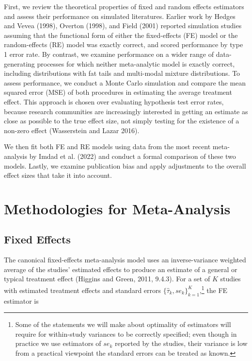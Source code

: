 \documentclass[12pt]{article}
\begin{document}
First, we review the theoretical properties of fixed and random effects estimators and assess their performance on simulated literatures. Earlier work by Hedges and Vevea (1998), Overton (1998), and Field (2001) reported simulation studies assuming that the functional form of either the fixed-effects (FE) model or the random-effects (RE) model was exactly correct, and scored performance by type 1 error rate. By contrast, we examine performance on a wider range of data-generating processes for which neither meta-analytic model is exactly correct, including distributions with fat tails and multi-modal mixture distributions. To assess performance, we conduct a Monte Carlo simulation and compare the mean squared error (MSE) of both procedures in estimating the average treatment effect. 
This approach is chosen over evaluating hypothesis test error rates, because research communities are increasingly interested in getting an estimate as close as possible to the true effect size, not simply testing for the existence of a non-zero effect (Wasserstein and Lazar 2016). 

We then fit both FE and RE models using data from the most recent meta-analysis by Imdad et al. (2022) and conduct a formal comparison of these two models. Lastly, we examine publication bias and apply adjustments to the overall effect sizes that take it into account.

\section{Methodologies for Meta-Analysis}

\subsection{Fixed Effects}

The canonical fixed-effects meta-analysis model uses an inverse-variance weighted average of the studies' estimated effects to produce an estimate of a general or typical treatment effect (Higgins and Green, 2011, 9.4.3). For a set of $K$ studies with estimated treatment effects and standard errors  $\{\hat{\tau}_k, se_k\}_{k=1}^K$,\footnote{Some of the statements we will make about optimality of estimators will require for within-study variances to be correctly specified; even though in practice we use estimators of $se_k$ reported by the studies, their variance is low from a practical viewpoint the standard errors can be treated as known.} the FE estimator is
\end{document}
